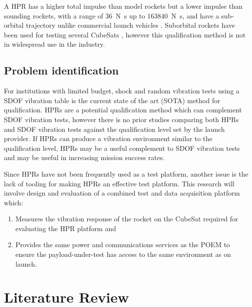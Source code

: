 \documentclass[a4paper,11pt]{article}
\begin{document}
A HPR has a higher total impulse than model rockets but a lower impulse than sounding rockets, with a range of \SI{36}{\newton\second} up to \SI{163840}{\newton\second}, and have a sub-orbital trajectory unlike commercial launch vehicles \cite{pierce2019development}. Suborbital rockets have been used for testing several CubeSats \cite{9316404,minelli2019mobile}, however this qualification method is not in widespread use in the industry.

\subsection{Problem identification}
For institutions with limited budget, shock and random vibration tests using a SDOF vibration table is the current state of the art (SOTA) method for qualification. HPRs are a potential qualification method which can complement SDOF vibration tests, however there is no prior studies comparing both HPRs and SDOF vibration tests against the qualification level set by the launch provider. If HPRs can produce a vibration environment similar to the qualification level, HPRs may be a useful complement to SDOF vibration tests and may be useful in increasing mission success rates.

Since HPRs have not been frequently used as a test platform, another issue is the lack of tooling for making HPRs an effective test platform. This research will involve design and evaluation of a combined test and data acquisition platform which:
\begin{enumerate}
  \item Measures the vibration response of the rocket on the CubeSat required for evaluating the HPR platform and
  \item Provides the same power and communications services as the POEM to ensure the payload-under-test has access to the same environment as on launch.
\end{enumerate}

\section{Literature Review}
\end{document}
